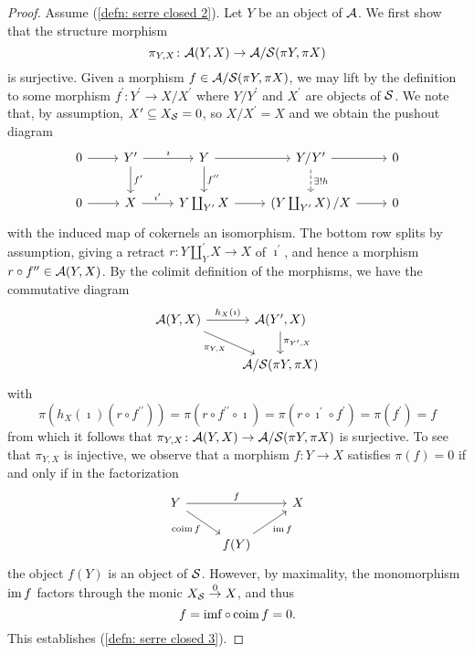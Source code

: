\begin{proof}
  Assume (\ref{defn: serre closed 2}).
  Let \(Y\) be an object of \(\mathcal{A}\).
  We first show that the structure morphism
  \[\pi_{Y,X} \colon \mathcal{A}(Y,X) \to \mathcal{A}/\mathcal{S}(\pi Y, \pi X)\]
  is surjective.
  Given a morphism \(f \in \mathcal{A}/\mathcal{S}(\pi Y, \pi X)\), we may lift by the definition to some morphism \(f^\prime \colon Y^\prime \to X/X^\prime\) where \(Y/Y^\prime\) and \(X^\prime\) are objects of \(\mathcal{S}\).
  We note that, by assumption, \(X^\prime \subseteq X_{\mathcal{S}} = 0\), so \(X/X^\prime = X\) and we obtain the pushout diagram
  \[\begin{tikzcd}
  0 \arrow{r} & Y^\prime \arrow{r}{\imath}\arrow{d}{f^\prime} & Y \arrow{r}\arrow{d}{f^{\prime\prime}} & Y/Y^\prime \arrow{r}\arrow[dashed]{d}{\exists !h} & 0\\
  0 \arrow{r} & X \arrow{r}{\imath^\prime} & Y \coprod_{Y^\prime} X \arrow{r} & \left( Y \coprod_{Y^\prime} X\right)/X \arrow{r} & 0
  \end{tikzcd}\]
  with the induced map of cokernels an isomorphism.
  The bottom row splits by assumption, giving a retract \(r \colon Y \coprod_Y^\prime X \to X\) of \(\imath^\prime\), and hence a morphism \(r \circ f^{\prime\prime} \in \mathcal{A}(Y,X)\).
  By the colimit definition of the morphisms, we have the commutative diagram
  \[\begin{tikzcd}
  \A(Y,X) \arrow{r}{h_X(\imath)}\arrow[swap]{rd}{\pi_{Y,X}} & \A(Y^\prime, X)\arrow{d}{\pi_{Y^\prime, X}}\\
  & \A/\Serre(\pi Y, \pi X)
  \end{tikzcd}\]
  with
  \[\pi(h_X(\imath)(r \circ f^{\prime\prime})) = \pi(r \circ f^{\prime\prime} \circ \imath) = \pi(r \circ \imath^\prime \circ f^\prime) = \pi(f^\prime) = f\]
  from which it follows that \(\pi_{Y,X} \colon \mathcal{A}(Y,X) \to \mathcal{A}/\mathcal{S}(\pi Y, \pi X)\) is surjective.
  To see that \(\pi_{Y,X}\) is injective, we observe that a morphism \(f \colon Y \to X\) satisfies \(\pi(f) = 0\) if and only if in the factorization
  \[\begin{tikzcd}
  Y \arrow{rr}{f}\arrow[swap]{rd}{\op{coim}f} && X\\
  & f(Y)\arrow[swap]{ur}{\op{im}f}
  \end{tikzcd}\]
  the object \(f(Y)\) is an object of \(\mathcal{S}\).
  However, by maximality, the monomorphism \(\operatorname{im} f\) factors through the monic \(X_{\mathcal{S}} \overset{0} \to X\), and thus
  \[f = \operatorname{im f} \circ \operatorname{coim} f = 0.\]
  This establishes (\ref{defn: serre closed 3}).


\end{proof}
